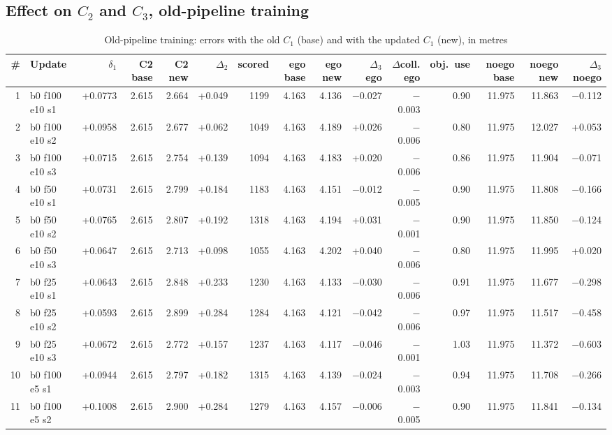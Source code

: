 \documentclass[10pt,a4paper]{article}
\begin{document}
\begin{landscape}\subsection{Effect on $C_2$ and $C_3$, old-pipeline training}\begin{table}[h!]\centering\scriptsize\caption{Old-pipeline training: errors with the old $C_1$ (base) and with the updated $C_1$ (new), in metres}
\begin{tabular}{rlrrrrrrrrrrrrr}\toprule
\# & Update & $\delta_1$ & C2 base & C2 new & $\Delta_2$ & scored & ego base & ego new & $\Delta_3$ ego & $\Delta$coll. ego & obj.\ use & noego base & noego new & $\Delta_3$ noego\\\midrule
1 & b0 f100 e10 s1 & +0.0773 & 2.615 & 2.664 & +0.049 & 1199 & 4.163 & 4.136 & $-$0.027 & $-$0.003 & 0.90 & 11.975 & 11.863 & $-$0.112\\
2 & b0 f100 e10 s2 & +0.0958 & 2.615 & 2.677 & +0.062 & 1049 & 4.163 & 4.189 & +0.026 & $-$0.006 & 0.80 & 11.975 & 12.027 & +0.053\\
3 & b0 f100 e10 s3 & +0.0715 & 2.615 & 2.754 & +0.139 & 1094 & 4.163 & 4.183 & +0.020 & $-$0.006 & 0.86 & 11.975 & 11.904 & $-$0.071\\
4 & b0 f50 e10 s1 & +0.0731 & 2.615 & 2.799 & +0.184 & 1183 & 4.163 & 4.151 & $-$0.012 & $-$0.005 & 0.90 & 11.975 & 11.808 & $-$0.166\\
5 & b0 f50 e10 s2 & +0.0765 & 2.615 & 2.807 & +0.192 & 1318 & 4.163 & 4.194 & +0.031 & $-$0.001 & 0.90 & 11.975 & 11.850 & $-$0.124\\
6 & b0 f50 e10 s3 & +0.0647 & 2.615 & 2.713 & +0.098 & 1055 & 4.163 & 4.202 & +0.040 & $-$0.006 & 0.80 & 11.975 & 11.995 & +0.020\\
7 & b0 f25 e10 s1 & +0.0643 & 2.615 & 2.848 & +0.233 & 1230 & 4.163 & 4.133 & $-$0.030 & $-$0.006 & 0.91 & 11.975 & 11.677 & $-$0.298\\
8 & b0 f25 e10 s2 & +0.0593 & 2.615 & 2.899 & +0.284 & 1284 & 4.163 & 4.121 & $-$0.042 & $-$0.006 & 0.97 & 11.975 & 11.517 & $-$0.458\\
9 & b0 f25 e10 s3 & +0.0672 & 2.615 & 2.772 & +0.157 & 1237 & 4.163 & 4.117 & $-$0.046 & $-$0.001 & 1.03 & 11.975 & 11.372 & $-$0.603\\
10 & b0 f100 e5 s1 & +0.0944 & 2.615 & 2.797 & +0.182 & 1315 & 4.163 & 4.139 & $-$0.024 & $-$0.003 & 0.94 & 11.975 & 11.708 & $-$0.266\\
11 & b0 f100 e5 s2 & +0.1008 & 2.615 & 2.900 & +0.284 & 1279 & 4.163 & 4.157 & $-$0.006 & $-$0.005 & 0.90 & 11.975 & 11.841 & $-$0.134\\

\end{tabular}
\end{table}
\end{landscape}
\end{document}
